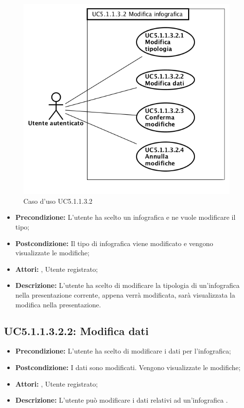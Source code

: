 \begin{figure}[h]
	\begin{center}
	\includegraphics[scale=0.4]{diagram/UC5-1-1-3-2.png}
	\caption{Caso d'uso UC5.1.1.3.2}
	\end{center}
\end{figure}
\begin{itemize}
	\item \textbf{Precondizione:} L'utente ha scelto un infografica e ne vuole modificare il tipo;
	\item \textbf{Postcondizione:} Il tipo di infografica viene modificato e vengono visualizzate le modifiche;
	\item \textbf{Attori:} , Utente registrato;
	\item \textbf{Descrizione:} L'utente ha scelto di modificare la tipologia di un'infografica nella presentazione corrente, appena verrà modificata, sarà visualizzata la modifica nella presentazione.
\end{itemize}
\subsection{ UC5.1.1.3.2.2: Modifica dati}

\begin{itemize}
	\item \textbf{Precondizione:} L'utente ha scelto di modificare i dati per l'infografica;
	\item \textbf{Postcondizione:} I dati sono modificati. Vengono visualizzate le modifiche;
	\item \textbf{Attori:} , Utente registrato;
	\item \textbf{Descrizione:} L'utente può modificare i dati relativi ad un'infografica .
\end{itemize}
